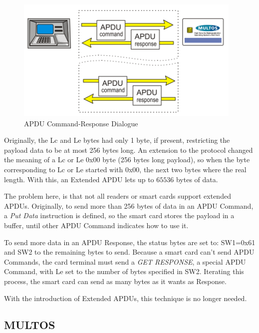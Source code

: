 \hfil




\begin{figure}[bth]
	\begin{center}
		\includegraphics[width=0.75\linewidth]{gfx/APDUdialog}
	\end{center}
	\caption{APDU Command-Response Dialogue}
	\label{fig:APDUdialog}
\end{figure}

Originally, the Lc and Le bytes had only 1 byte, if present, restricting the payload data to be at most 256 bytes long. An extension to the protocol changed the meaning of a Lc or Le 0x00 byte (256 bytes long payload), so when the byte corresponding to Lc or Le started with 0x00, the next two bytes where the real length.  With this, an Extended APDU lets up to $65536$ bytes of data.

The problem here, is that not all readers or smart cards support extended APDUs. Originally, to send more than 256 bytes of data in an APDU Command, a \textit{Put Data} instruction is defined, so the smart card stores the payload in a buffer, until other APDU Command indicates how to use it.

To send more data in an APDU Response, the status bytes are set to: SW1=0x61 and SW2 to the remaining bytes to send. Because a smart card can't send APDU Commands, the card terminal must send a \textit{GET RESPONSE}, a special APDU Command, with Le set to the number of bytes specified in SW2. Iterating this process, the smart card can send as many bytes as it wants as Response.

With the introduction of Extended APDUs, this technique is no longer needed.






\subsection{MULTOS}

